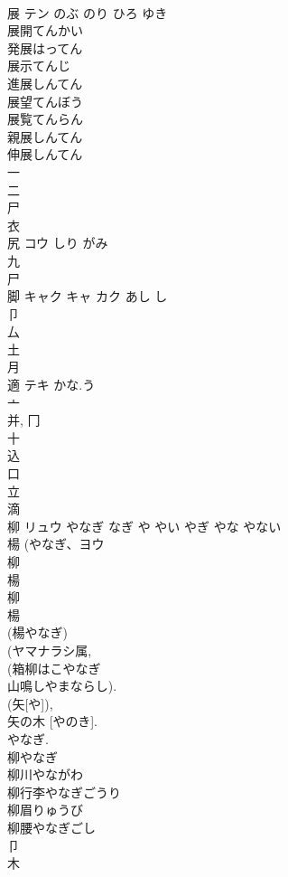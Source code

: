 \documentclass[8pt]{extreport}
\begin{document}
\begin{CJK}{UTF8}{min}
\\	展	テン	のぶ のり ひろ ゆき	
\\	展開てんかい
\\	発展はってん
\\	展示てんじ
\\	進展しんてん
\\	展望てんぼう
\\	展覧てんらん
\\	親展しんてん
\\	伸展しんてん
\\	一 
\\	二 
\\	尸 
\\	衣 
\\	尻	コウ	しり がみ	
\\	九 
\\	尸 
\\	脚	キャク キャ カク	あし し	
\\	卩 
\\	厶 
\\	土 
\\	月 
\\	適	テキ	かな.う	
\\	亠 
\\	并, 冂 
\\	十 
\\	込 
\\	口 
\\	立 
\\	滴 
\\	柳	リュウ	やなぎ なぎ や やい やぎ やな やない	
\\	楊 (やなぎ、ヨウ 
\\	柳 
\\	楊 
\\	柳 
\\	楊 
\\	(楊やなぎ) 
\\	(ヤマナラシ属, 
\\	(箱柳はこやなぎ 
\\	山鳴しやまならし). 
\\	(矢[や]), 
\\	矢の木 [やのき]. 
\\	やなぎ. 
\\	柳やなぎ 
\\	柳川やながわ 
\\	柳行李やなぎごうり 
\\	柳眉りゅうび 
\\	柳腰やなぎごし 
\\	卩 
\\	木 

\end{CJK}
\end{document}
